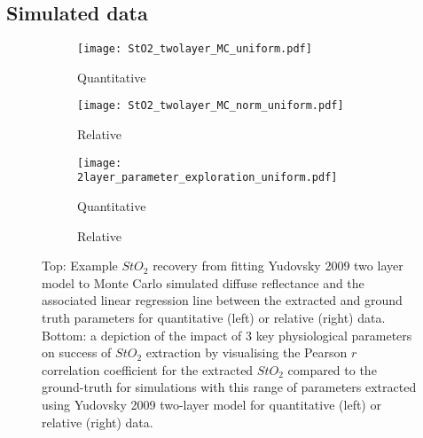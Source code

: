 \subsection{Simulated data}
\begin{figure}[htbp]
    \centering
    \begin{subfigure}{0.49\textwidth}
        \texttt{[image: StO2\_twolayer\_MC\_uniform.pdf]}
        \caption{Quantitative}
        \label{fig:egparamsStO2MCu}
    \end{subfigure}
    \begin{subfigure}{0.49\textwidth}
        \texttt{[image: StO2\_twolayer\_MC\_norm\_uniform.pdf]}
        \caption{Relative}
        \label{fig:egparamsStO2MCnormu}
    \end{subfigure}
    \begin{subfigure}{0.49\textwidth}
        \texttt{[image: 2layer\_parameter\_exploration\_uniform.pdf]}
        \caption{Quantitative}
        \label{fig:egparamsfailureMCu}
    \end{subfigure}
    \begin{subfigure}{0.49\textwidth}
        \caption{Relative}
        \label{fig:egparamsfailureMCnormu}
    \end{subfigure}
    \caption{Top: Example $StO_2$ recovery from fitting Yudovsky 2009 two layer model to Monte Carlo simulated diffuse reflectance and the associated linear regression line between the extracted and ground truth parameters for quantitative (left) or relative (right) data. Bottom: a depiction of the impact of 3 key physiological parameters on success of $StO_2$ extraction by visualising the Pearson $r$ correlation coefficient for the extracted $StO_2$ compared to the ground-truth for simulations with this range of parameters extracted using Yudovsky 2009 two-layer model for quantitative (left) or relative (right) data.}
    \label{fig:MC2layeruniform}
\end{figure}

